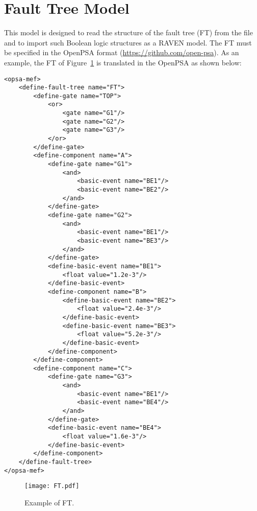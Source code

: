 \section{Fault Tree Model}
\label{sec:FTModel}

This model is designed to read the structure of the fault tree (FT) from the file and to import such Boolean logic structures as a RAVEN model.
The FT must be specified in the OpenPSA format (\href{<url>}{https://github.com/open-psa}).
As an example, the FT of Figure~\ref{fig:FT} is translated in the OpenPSA as shown below:

\begin{lstlisting}[style=XML,morekeywords={anAttribute},caption=FT in OpenPSA format., label=lst:FTModel]
<opsa-mef>
    <define-fault-tree name="FT">
        <define-gate name="TOP">
            <or>
                <gate name="G1"/>
                <gate name="G2"/>
                <gate name="G3"/>
            </or>
        </define-gate>
        <define-component name="A">
            <define-gate name="G1">
                <and>
                    <basic-event name="BE1"/>
                    <basic-event name="BE2"/>
                </and>
            </define-gate>
            <define-gate name="G2">
                <and>
                    <basic-event name="BE1"/>
                    <basic-event name="BE3"/>
                </and>
            </define-gate>
            <define-basic-event name="BE1">
                <float value="1.2e-3"/>
            </define-basic-event>
            <define-component name="B">
                <define-basic-event name="BE2">
                    <float value="2.4e-3"/>
                </define-basic-event>
                <define-basic-event name="BE3">
                    <float value="5.2e-3"/>
                </define-basic-event>
            </define-component>
        </define-component>
        <define-component name="C">
            <define-gate name="G3">
                <and>
                    <basic-event name="BE1"/>
                    <basic-event name="BE4"/>
                </and>
            </define-gate>
            <define-basic-event name="BE4">
                <float value="1.6e-3"/>
            </define-basic-event>
        </define-component>
    </define-fault-tree>
</opsa-mef>
\end{lstlisting}

\begin{figure}
    \centering
    \centerline{\texttt{[image: FT.pdf]}}
    \caption{Example of FT.}
    \label{fig:FT}
\end{figure}

